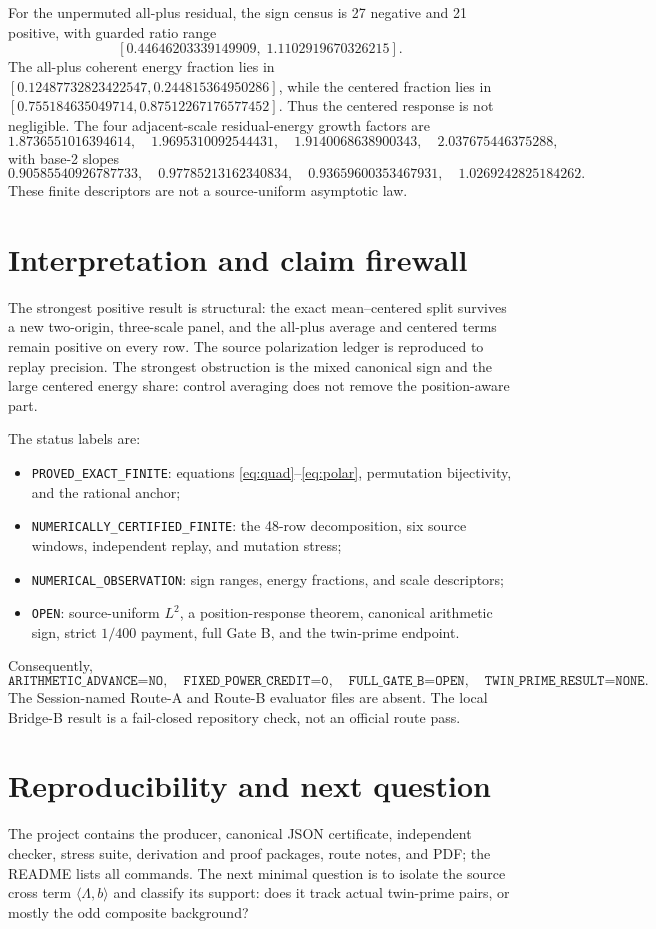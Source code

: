\documentclass[10pt]{article}
\begin{document}
For the unpermuted all-plus residual, the sign census is 27 negative and 21
positive, with guarded ratio range
\[
 [0.44646203339149909,\;1.1102919670326215].
\]
The all-plus coherent energy fraction lies in
$[0.12487732823422547,0.244815364950286]$, while the centered fraction lies
in $[0.755184635049714,0.87512267176577452]$.  Thus the centered response
is not negligible.  The four adjacent-scale residual-energy growth factors
are
\[
1.8736551016394614,\quad1.9695310092544431,\quad
1.9140068638900343,\quad2.037675446375288,
\]
with base-2 slopes
\[
0.90585540926787733,\quad0.97785213162340834,\quad
0.93659600353467931,\quad1.0269242825184262.
\]
These finite descriptors are not a source-uniform asymptotic law.

\section{Interpretation and claim firewall}
The strongest positive result is structural: the exact mean--centered split
survives a new two-origin, three-scale panel, and the all-plus average and
centered terms remain positive on every row.  The source polarization ledger
is reproduced to replay precision.  The strongest obstruction is the mixed
canonical sign and the large centered energy share: control averaging does
not remove the position-aware part.

The status labels are:
\begin{itemize}
\item \texttt{PROVED\_EXACT\_FINITE}: equations
      \eqref{eq:quad}--\eqref{eq:polar}, permutation bijectivity, and the
      rational anchor;
\item \texttt{NUMERICALLY\_CERTIFIED\_FINITE}: the 48-row decomposition,
      six source windows, independent replay, and mutation stress;
\item \texttt{NUMERICAL\_OBSERVATION}: sign ranges, energy fractions, and
      scale descriptors;
\item \texttt{OPEN}: source-uniform $L^2$, a position-response theorem,
      canonical arithmetic sign, strict $1/400$ payment, full Gate B, and
      the twin-prime endpoint.
\end{itemize}
Consequently,
\[
 \texttt{ARITHMETIC\_ADVANCE=NO},\quad\texttt{FIXED\_POWER\_CREDIT=0},\quad
 \texttt{FULL\_GATE\_B=OPEN},\quad\texttt{TWIN\_PRIME\_RESULT=NONE}.
\]
The Session-named Route-A and Route-B evaluator files are absent.  The local
Bridge-B result is a fail-closed repository check, not an official route pass.

\section{Reproducibility and next question}
The project contains the producer, canonical JSON certificate, independent
checker, stress suite, derivation and proof packages, route notes, and PDF;
the README lists all commands.  The next minimal question is to isolate the
source cross term $\langle\Lambda,b\rangle$ and classify its support: does it
track actual twin-prime pairs, or mostly the odd composite background?



\end{document}
